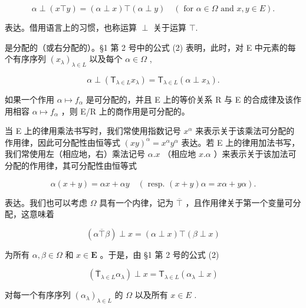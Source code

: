 \[
\alpha \perp (x \top y) = (\alpha \perp x) \top (\alpha \perp y) \quad (\text { for   } \alpha \in \Omega \text {   and   } x, y \in E).\tag{6}
\]

表达。借用语言上的习惯，也称运算 \(\perp\) 关于运算 \(\top\).

是分配的（或右分配的）。§1 第 2 号中的公式 (2) 表明，此时，对 E 中元素的每个有序序列 \((x_{\lambda})_{\lambda \in L}\) 以及每个 \(\alpha \in \Omega\) ,

\[
\alpha \perp \left(\mathsf {T} _ {\lambda \in L} x _ {\lambda}\right) = \mathsf {T} _ {\lambda \in L} (\alpha \perp x _ {\lambda}).\tag{7}
\]

如果一个作用 \(\alpha\mapsto f_{\alpha}\) 是可分配的，并且 E 上的等价关系 R 与 E 的合成律及该作用相容 \(\alpha\mapsto f_{\alpha}\) ，则 E/R 上的商作用是可分配的。

当 E 上的律用乘法书写时，我们常使用指数记号 \(x^{\alpha}\) 来表示关于该乘法可分配的作用律，因此可分配性由恒等式 \((xy)^{\alpha} = x^{\alpha}y^{\alpha}\) 表达。若 E 上的律用加法书写，我们常使用左（相应地，右）乘法记号 \(\alpha.x\) （相应地 \(x.\alpha\) ）来表示关于该加法可分配的作用律，其可分配性由恒等式

\[
\alpha (x + y) = \alpha x + \alpha y \quad (\text { resp. } (x + y) \alpha = x \alpha + y \alpha).
\]

表达。我们也可以考虑 \(\Omega\) 具有一个内律，记为 \(\overline{\top}\) ，且作用律关于第一个变量可分配，这意味着

\[
(\alpha \overline{\top} \beta) \perp x = (\alpha \perp x) \top (\beta \perp x)\tag{8}
\]

为所有 \(\alpha, \beta \in \Omega\) 和 \(x \in \mathbf{E}\) 。于是，由 §1 第 2 号的公式 (2)

\[
\left(\overline {{\mathsf {T}}} _ {\lambda \in L} \alpha_ {\lambda}\right) \perp x = \mathsf {T} _ {\lambda \in L} (\alpha_ {\lambda} \perp x)\tag{9}
\]

对每一个有序序列 \((\alpha_{\lambda})_{\lambda \in L}\) 的 \(\Omega\) 以及所有 \(x\in E\) .

